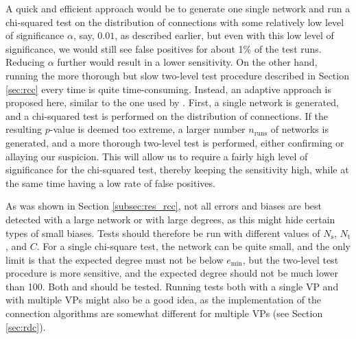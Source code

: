 A quick and efficient approach would be to generate one single network and run a chi-squared test on the distribution of connections with some relatively low level of significance $\alpha$, say, $0.01$, as described earlier, but even with this low level of significance, we would still see false positives for about 1\% of the test runs. Reducing $\alpha$ further would result in a lower sensitivity. On the other hand, running the more thorough but slow two-level test procedure described in Section \ref{sec:rcc} every time is quite time-consuming. Instead, an adaptive approach is proposed here, similar to the one used by . First, a single network is generated, and a chi-squared test is performed on the distribution of connections. If the resulting $p$-value is deemed too extreme, a larger number $n_\text{runs}$ of networks is generated, and a more thorough two-level test is performed, either confirming or allaying our suspicion. This will allow us to require a fairly high level of significance for the chi-squared test, thereby keeping the sensitivity high, while at the same time having a low rate of false positives.

As was shown in Section \ref{subsec:res_rcc}, not all errors and biases are best detected with a large network or with large degrees, as this might hide certain types of small biases. Tests should therefore be run with different values of $N_\text{s}$, $N_\text{t}$, and $C$. For a single chi-square test, the network can be quite small, and the only limit is that the expected degree must not be below $e_\text{min}$, but the two-level test procedure is more sensitive, and the expected degree should not be much lower than 100. Both  and  should be tested. Running tests both with a single VP and with multiple VPs might also be a good idea, as the implementation of the connection algorithms are somewhat different for multiple VPs (see Section \ref{sec:rdc}).


